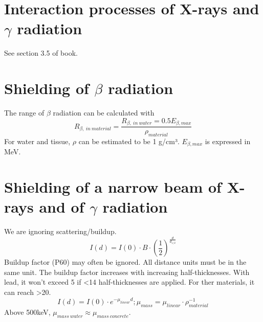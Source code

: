 \section{Interaction processes of X-rays and $\gamma$ radiation}
See section 3.5 of book.
\section{Shielding of $\beta$ radiation}
The range of $\beta$ radiation can be calculated with
\[R_{\beta,\ in\ material} = \frac{R_{\beta,\ in\ water} = 0.5 E_{\beta,max}}{\rho_{material}}\]
For water and tissue, $\rho$ can be estimated to be 1 g/cm³. $E_{\beta,max}$ is expressed in MeV.\\
\section{Shielding of a narrow beam of X-rays and of $\gamma$ radiation}
We are ignoring scattering/buildup.
\[I(d) = I(0)\cdot B\cdot(\frac{1}{2})^{\frac{d}{d_{1/2}}}\]
Buildup factor (P60) may often be ignored. All distance units must be in the same unit. The buildup factor increases with increasing half-thicknesses. With lead, it won't exceed 5 if <14 half-thicknesses are applied. For ther materials, it can reach >20.\\
\[I(d) = I(0)\cdot e^{-\mu_{linear} d}; \mu_{mass} = \mu_{linear}\cdot\rho_{material}^{-1}\]
Above 500keV, $\mu_{mass\ water}\approx\mu_{mass\ concrete}$.\\
